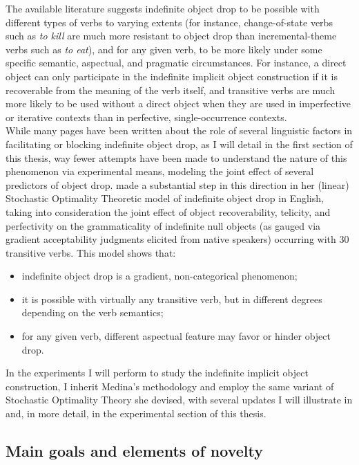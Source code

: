 The available literature suggests indefinite object drop to be possible with different types of verbs to varying extents (for instance, change-of-state verbs such as \textit{to kill} are much more resistant to object drop than incremental-theme verbs such as \textit{to eat}), and for any given verb, to be more likely under some specific semantic, aspectual, and pragmatic circumstances. For instance, a direct object can only participate in the indefinite implicit object construction if it is recoverable from the meaning of the verb itself, and transitive verbs are much more likely to be used without a direct object when they are used in imperfective or iterative contexts than in perfective, single-occurrence contexts.\\
While many pages have been written about the role of several linguistic factors in facilitating or blocking indefinite object drop, as I will detail in the first section of this thesis, way fewer attempts have been made to understand the nature of this phenomenon via experimental means, modeling the joint effect of several predictors of object drop. \textcite{Medina2007} made a substantial step in this direction in her (linear) Stochastic Optimality Theoretic model of indefinite object drop in English, taking into consideration the joint effect of object recoverability, telicity, and perfectivity on the grammaticality of indefinite null objects (as gauged via gradient acceptability judgments elicited from native speakers) occurring with 30 transitive verbs. This model shows that:
\begin{itemize}
    \item indefinite object drop is a gradient, non-categorical phenomenon;
    \item it is possible with virtually any transitive verb, but in different degrees depending on the verb semantics;
    \item for any given verb, different aspectual feature may favor or hinder object drop.
\end{itemize}

In the experiments I will perform to study the indefinite implicit object construction, I inherit Medina's methodology and employ the same variant of Stochastic Optimality Theory she devised, with several updates I will illustrate in  and, in more detail, in the experimental section of this thesis.


\subsection{Main goals and elements of novelty} 

